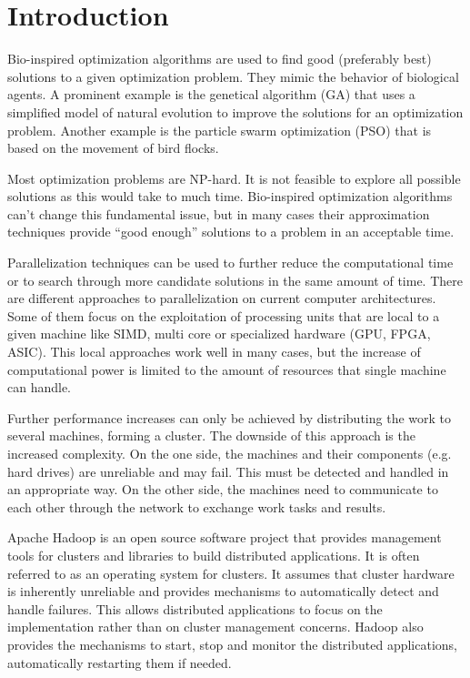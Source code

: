 \chapter{Introduction}
Bio-inspired optimization algorithms are used to find good (preferably best) solutions to a given optimization problem. They mimic the behavior of biological agents. A prominent example is the genetical algorithm (GA) \cite{sivanandam2008genetic} that uses a simplified model of natural evolution to improve the solutions for an optimization problem. Another example is the particle swarm optimization (PSO) \cite{kennedy2010particle} that is based on the movement of bird flocks.

Most optimization problems are NP-hard. It is not feasible to explore all possible solutions as this would take to much time. Bio-inspired optimization algorithms can't change this fundamental issue, but in many cases their approximation techniques provide ``good enough'' solutions to a problem in an acceptable time.

Parallelization techniques can be used to further reduce the computational time or to search through more candidate solutions in the same amount of time. There are different approaches to parallelization on current computer architectures. Some of them focus on the exploitation of processing units that are local to a given machine like SIMD, multi core or specialized hardware (GPU, FPGA, ASIC). This local approaches work well in many cases, but the increase of computational power is limited to the amount of resources that single machine can handle.

Further performance increases can only be achieved by distributing the work to several machines, forming a cluster. The downside of this approach is the increased complexity. On the one side, the machines and their components (e.g. hard drives) are unreliable and may fail. This must be detected and handled in an appropriate way. On the other side, the machines need to communicate to each other through the network to exchange work tasks and results.

Apache Hadoop \cite{hadoop} is an open source software project that provides management tools for clusters and libraries to build distributed applications. It is often referred to as an operating system for clusters. It assumes that cluster hardware is inherently unreliable and provides mechanisms to automatically detect and handle failures. This allows distributed applications to focus on the implementation rather than on cluster management concerns. Hadoop also provides the mechanisms to start, stop and monitor the distributed applications, automatically restarting them if needed.

